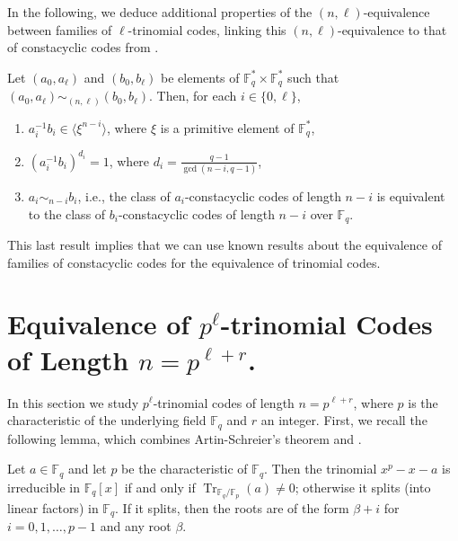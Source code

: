 \documentclass[12pt]{elsarticle}
\newcommand{\Fq}{\mathbb{F}_{q}}
\DeclareMathOperator{\Tr}{Tr}
\theoremstyle{break}
{\theorembodyfont{\upshape}
    \newtheorem{theorem}{Theorem}[section] %
    \newtheorem{lemma}[theorem]{Lemma} %
    \newtheorem{proposition}[theorem]{Proposition}
    \newtheorem{corollary}[theorem]{Corollary}
    \newtheorem{definition}[theorem]{Definition}
    \newtheorem{example}[theorem]{Example}
    \newtheorem{remark}[theorem]{Remark}
    \newtheorem{conjecture}[theorem]{Conjecture}
    \newtheorem*{proof}{{Proof}}
	\newtheorem*{notation}{Notation}
	\newtheorem*{main}{Cain Theorem}
	\newtheorem*{problem}{Problem}
}
\begin{document}
In the following, we deduce additional properties of the $(n,\ell)$-equivalence between families of $\ell$-trinomial codes, linking this $(n,\ell)$-equivalence to that of constacyclic codes from \cite{Chen2014,Chen2012}.

\begin{corollary}
    \label{Eq_Consta}
Let $ (a_0, a_{\ell}) $ and $ (b_0, b_{\ell}) $ be elements of $ \Fq^{*} \times \Fq^{*} $ such that $ (a_0, a_{\ell}) \sim_{(n, \ell)} (b_0, b_{\ell}) $. Then, for each $ i \in \{0, \ell\} $,
\begin{enumerate}
    \item $ a_i^{-1} b_i \in \langle \xi^{n-i} \rangle $, where $ \xi $ is a primitive element of $ \Fq^* $,
    \item $ (a_i^{-1} b_i)^{d_i} = 1 $, where $ d_i = \frac{q-1}{\gcd(n-i, q-1)} $,
    \item $ a_i \sim_{n-i} b_i $, i.e., the class of $a_i$-constacyclic codes of length $n-i$ is equivalent to the class of $b_i$-constacyclic codes of length $n-i$ over $\Fq.$
\end{enumerate}
\end{corollary}

This last result implies that we can use known results about the equivalence of families of constacyclic codes for the equivalence of trinomial codes.






\section{Equivalence of $p^{\ell}$-trinomial Codes of Length $n=p^{\ell+r}$.}\label{sec:eq_trinomial_special}

In this section we study $p^{\ell}$-trinomial  codes of length $n = p^{\ell+r}$, where $p$ is the characteristic of the underlying field $\Fq$ and $r$ an integer. First, we recall the following lemma, which combines Artin-Schreier's theorem \cite[Theorem 12.2.1]{Roman1995} and \cite[Corollary 3.79]{Lidl1987}.


\begin{lemma}\label{LLL.6}
 Let $a \in \mathbb{F}_q$ and let $p$ be the characteristic of $\mathbb{F}_q$. Then the trinomial $x^p - x - a$ is irreducible in $\mathbb{F}_q[x]$ if and only if $\Tr_{\mathbb{F}_q / \mathbb{F}_p }(a) \neq 0$; otherwise it splits (into linear factors) in $\mathbb{F}_q$. If it splits, then the roots are of the form $\beta+i$ for $i=0,1,\dots,p-1$ and any root $\beta$.

\end{lemma}
\end{document}

